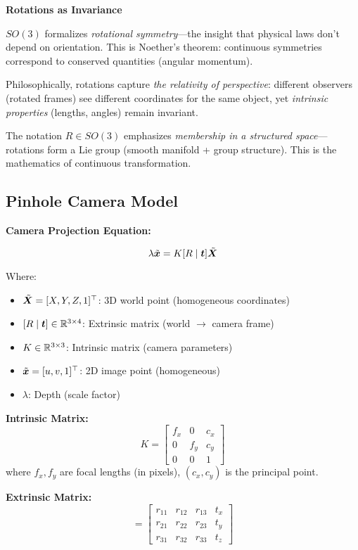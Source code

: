 \begin{philobox}
	\textbf{Rotations as Invariance}
	
	$SO(3)$ formalizes \textit{rotational symmetry}---the insight that physical laws don't depend on orientation. This is Noether's theorem: continuous symmetries correspond to conserved quantities (angular momentum).
	
	Philosophically, rotations capture \textit{the relativity of perspective}: different observers (rotated frames) see different coordinates for the same object, yet \textit{intrinsic properties} (lengths, angles) remain invariant.
	
	The notation $R \in SO(3)$ emphasizes \textit{membership in a structured space}---rotations form a Lie group (smooth manifold + group structure). This is the mathematics of continuous transformation.
\end{philobox}

\subsection{Pinhole Camera Model}

\begin{seanbox}{3.9}
	\textbf{Camera Projection Equation:}
	
	\begin{equation}
		\lambda \tilde{\bm{x}} = K [R \mid \bm{t}] \tilde{\bm{X}}
	\end{equation}
	
	Where:
	\begin{itemize}
		\item $\tilde{\bm{X}} = [X, Y, Z, 1]^\top$: 3D world point (homogeneous coordinates)
		\item $[R \mid \bm{t}] \in \mathbb{R}^{3 \times 4}$: Extrinsic matrix (world $\to$ camera frame)
		\item $K \in \mathbb{R}^{3 \times 3}$: Intrinsic matrix (camera parameters)
		\item $\tilde{\bm{x}} = [u, v, 1]^\top$: 2D image point (homogeneous)
		\item $\lambda$: Depth (scale factor)
	\end{itemize}
	
	\textbf{Intrinsic Matrix:}
	\begin{equation}
		K = \begin{bmatrix}
			f_x & 0 & c_x \\
			0 & f_y & c_y \\
			0 & 0 & 1
		\end{bmatrix}
	\end{equation}
	where $f_x, f_y$ are focal lengths (in pixels), $(c_x, c_y)$ is the principal point.
	
	\textbf{Extrinsic Matrix:}
	\begin{equation}
		[R \mid \vect{t}] = \begin{bmatrix}
			r_{11} & r_{12} & r_{13} & t_x \\
			r_{21} & r_{22} & r_{23} & t_y \\
			r_{31} & r_{32} & r_{33} & t_z
		\end{bmatrix}
	\end{equation}
\end{seanbox}

